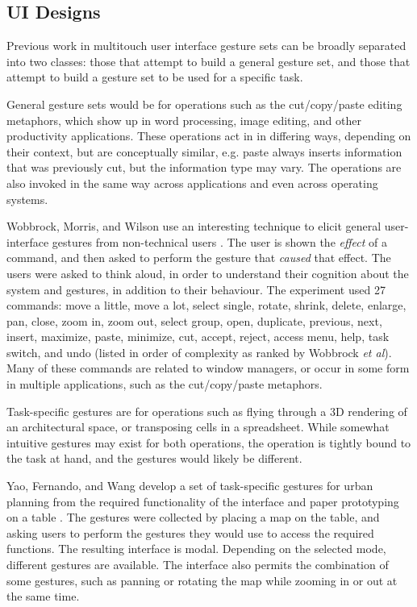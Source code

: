 \subsection{UI Designs}
Previous work in multitouch user interface gesture sets can be broadly separated into two classes: those that attempt to build a general gesture set, and those that attempt to build a gesture set to be used for a specific task. 

General gesture sets would be for operations such as the cut/copy/paste editing metaphors, which show up in word processing, image editing, and other productivity applications. 
These operations act in in differing ways, depending on their context, but are conceptually similar, e.g. paste always inserts information that was previously cut, but the information type may vary. The operations are also invoked in the same way across applications and even across operating systems. 

Wobbrock, Morris, and Wilson use an interesting technique to elicit general user-interface gestures from non-technical users \citep{wobbrock2009user}.
The user is shown the \textit{effect} of a command, and then asked to perform the gesture that \textit{caused} that effect. 
The users were asked to think aloud, in order to understand their cognition about the system and gestures, in addition to their behaviour. 
The experiment used 27 commands: move a little, move a lot, select single, rotate, shrink, delete, enlarge, pan, close, zoom in, zoom out, select group, open, duplicate, previous, next, insert, maximize, paste, minimize, cut, accept, reject, access menu, help, task switch, and undo (listed in order of complexity as ranked by Wobbrock \textit{et al}).
Many of these commands are related to window managers, or occur in some form in multiple applications, such as the cut/copy/paste metaphors.

Task-specific gestures are for operations such as flying through a 3D rendering of an architectural space, or transposing cells in a spreadsheet. 
While somewhat intuitive gestures may exist for both operations, the operation is tightly bound to the task at hand, and the gestures would likely be different. 

Yao, Fernando, and Wang develop a set of task-specific gestures for urban planning from the required functionality of the interface and paper prototyping on a table \citep{yao2012multi}. 
The gestures were collected by placing a map on the table, and asking users to perform the gestures they would use to access the required functions. 
The resulting interface is modal.
Depending on the selected mode, different gestures are available. 
The interface also permits the combination of some gestures, such as panning or rotating the map while zooming in or out at the same time. 

